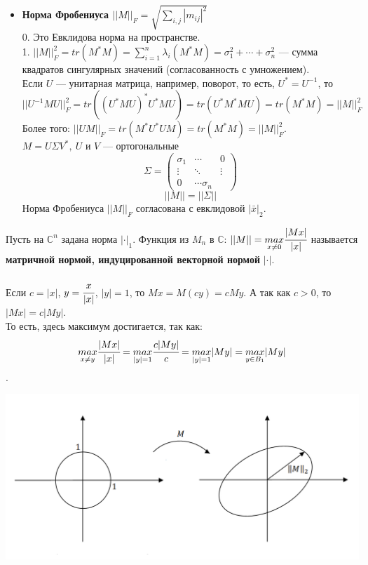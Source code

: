 \documentclass[12pt]{article}
\theoremstyle{definition}
\numberwithin{equation}{section}
\begin{document}
\begin{itemize}
		\item \textbf{Норма Фробениуса $||M||_F=\sqrt{\sum\limits_{i,j}|m_{ij}|^2}$}\\
		0. Это Евклидова норма на пространстве.\\
		1. $||M||_F^2=tr(M^*M)=\sum\limits_{i=1}^n\lambda_i(M^*M)=\sigma_1^2+\cdots+\sigma_n^2$ --- сумма квадратов сингулярных значений (согласованность с умножением).\\
		Если $U$ --- унитарная матрица, например, поворот, то есть, $U^*=U^{-1}$, то $$||U^{-1}MU||_F^2=tr((U^*MU)^*U^*MU)=tr(U^*M^*MU)=tr(M^*M)=||M||_F^2$$
		Более того: $||UM||_F=tr(M^*U^*UM)=tr(M^*M)=||M||_F^2$.\\
		$M=U\Sigma V^*,~U$ и $V$ --- ортогональные\\
		\[\Sigma = \begin{pmatrix}
		\sigma_1 & \cdots & 0\\
		\vdots & \ddots & \vdots\\
		0 & \cdots \sigma_n
		\end{pmatrix}\]
		$$||M||=||\Sigma||$$
		Норма Фробениуса $||M||_F$ согласована с евклидовой $|\bar x|_2$.
	\end{itemize}
	Пусть на $\mathbb{C}^n$ задана норма $|\cdot |_1$. Функция из $M_n$ в $\mathbb{C}$: $||M||=\underset{x\neq 0}{max} \cfrac{|Mx|}{|x|}$ называется \textbf{матричной нормой, индуцированной векторной нормой} $|\cdot|$.\\ \\
	Если $c=|x|$, $y=\cfrac{x}{|x|}$, $|y|=1$, то $Mx=M(cy)=cMy.$ А так как $c>0$, то $|Mx|=c|My|$.\\
	То есть, здесь максимум достигается, так как: $$\underset{x\neq y}{max}\cfrac{|Mx|}{|x|}=\underset{|y|=1}{max}\cfrac{c|My|}{c}=\underset{|y|=1}{max}|My|=\underset{y\in B_1}{max}|My|$$.\begin{center}
		\includegraphics[scale=0.6]{l7_1.png}\end{center}
\end{document}
